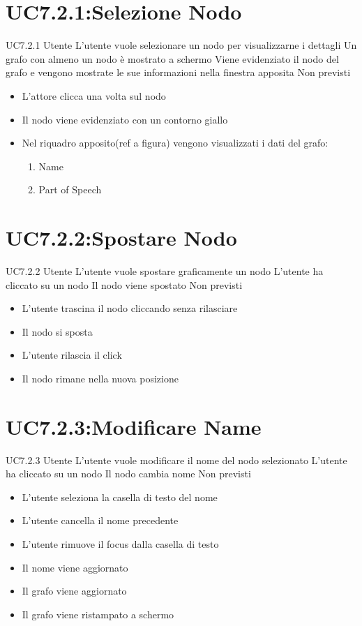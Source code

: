 \documentclass[../AnalisideiRequisiti.tex]{subfiles}
\begin{document}
\section{UC7.2.1:Selezione Nodo}
\UserCase
{UC7.2.1}
{Utente}
{}
{L'utente vuole selezionare un nodo per visualizzarne i dettagli}
{Un grafo con almeno un nodo è mostrato a schermo}
{Viene evidenziato il nodo del grafo e vengono mostrate le sue informazioni nella finestra apposita}
{Non previsti}
{
	\begin{itemize}
		\item{} L'attore clicca una volta sul nodo
		\item{} Il nodo viene evidenziato con un contorno giallo
		\item{} Nel riquadro apposito(ref a figura) vengono visualizzati i dati del grafo:
		\begin{enumerate}
			\item{} Name
			\item{} Part of Speech
		\end{enumerate}
	\end{itemize}
}
\section{UC7.2.2:Spostare Nodo}
\UserCase
{UC7.2.2}
{Utente}
{}
{L'utente vuole spostare graficamente un nodo}
{L'utente ha cliccato su un nodo }
{Il nodo viene spostato}
{Non previsti}
{\begin{itemize}
		\item{} L'utente trascina il nodo cliccando senza rilasciare
		\item{} Il nodo si sposta
		\item{} L'utente rilascia il click
		\item{} Il nodo rimane nella nuova posizione
\end{itemize}
}

\section{UC7.2.3:Modificare Name}
\UserCase
{UC7.2.3}
{Utente}
{}
{L'utente vuole modificare il nome del nodo selezionato}
{L'utente ha cliccato su un nodo }
{Il nodo cambia nome}
{Non previsti}
{\begin{itemize}
		\item{} L'utente seleziona la casella di testo del nome
		\item{} L'utente cancella il nome precedente
		\item{} L'utente rimuove il focus dalla casella di testo
		\item{} Il nome viene aggiornato
		\item{} Il grafo viene aggiornato 
		\item{} Il grafo viene ristampato a schermo 
\end{itemize}}
\end{document}
